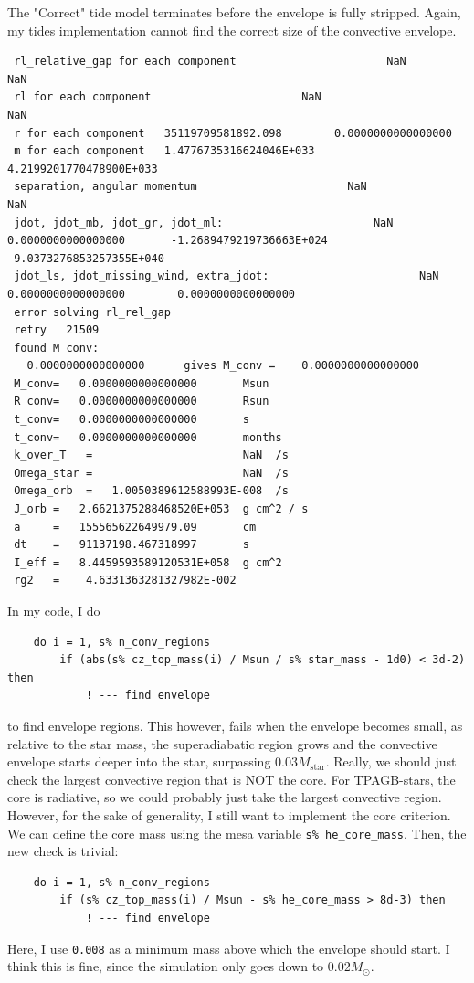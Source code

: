 \documentclass[a4paper,10pt]{article}
\begin{document}
\begin{figure}[ht]
    \centering
\end{figure}

The "Correct" tide model terminates before the envelope is fully stripped. Again, my tides implementation cannot find the correct size of the convective envelope.

\nextpage

\begin{verbatim}
 rl_relative_gap for each component                       NaN                       NaN
 rl for each component                       NaN                       NaN
 r for each component   35119709581892.098        0.0000000000000000     
 m for each component   1.4776735316624046E+033   4.2199201770478900E+033
 separation, angular momentum                       NaN                       NaN
 jdot, jdot_mb, jdot_gr, jdot_ml:                       NaN   0.0000000000000000       -1.2689479219736663E+024  -9.0373276853257355E+040
 jdot_ls, jdot_missing_wind, extra_jdot:                       NaN   0.0000000000000000        0.0000000000000000     
 error solving rl_rel_gap
 retry   21509
 found M_conv:
   0.0000000000000000      gives M_conv =    0.0000000000000000     
 M_conv=   0.0000000000000000       Msun
 R_conv=   0.0000000000000000       Rsun
 t_conv=   0.0000000000000000       s
 t_conv=   0.0000000000000000       months
 k_over_T   =                       NaN  /s
 Omega_star =                       NaN  /s
 Omega_orb  =   1.0050389612588993E-008  /s
 J_orb =   2.6621375288468520E+053  g cm^2 / s
 a     =   155565622649979.09       cm
 dt    =   91137198.467318997       s
 I_eff =   8.4459593589120531E+058  g cm^2
 rg2   =    4.6331363281327982E-002
\end{verbatim}

In my code, I do
\begin{verbatim}
    do i = 1, s% n_conv_regions
        if (abs(s% cz_top_mass(i) / Msun / s% star_mass - 1d0) < 3d-2) then
            ! --- find envelope
\end{verbatim}
to find envelope regions. This however, fails when the envelope becomes small, as relative to the star mass, the superadiabatic region grows and the convective envelope starts deeper into the star, surpassing \(0.03M_\text{star}\). Really, we should just check the largest convective region that is NOT the core. For TPAGB-stars, the core is radiative, so we could probably just take the largest convective region. However, for the sake of generality, I still want to implement the core criterion. We can define the core mass using the mesa variable \lstinline[style=output, breaklines=true]|s% he_core_mass|. Then, the new check is trivial:
\begin{verbatim}
    do i = 1, s% n_conv_regions
        if (s% cz_top_mass(i) / Msun - s% he_core_mass > 8d-3) then
            ! --- find envelope
\end{verbatim}
Here, I use \lstinline[style=output, breaklines=true]|0.008| as a minimum mass above which the envelope should start. I think this is fine, since the simulation only goes down to \(0.02M_\odot \).
\end{document}
